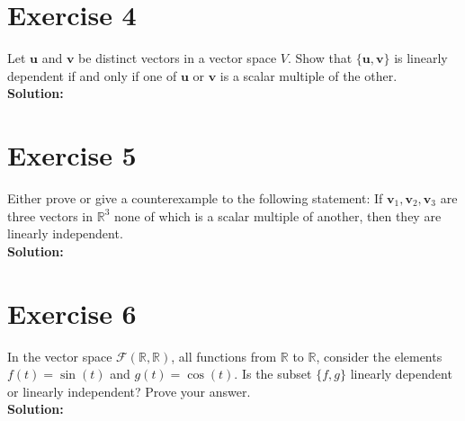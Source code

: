 \documentclass{article}
\begin{document}
\section*{Exercise 4}
Let $\mathbf{u}$ and $\mathbf{v}$ be distinct vectors in a vector space $V$. Show that $\{\mathbf{u}, \mathbf{v}\}$ is linearly dependent if and only if one of $\mathbf{u}$ or $\mathbf{v}$ is a scalar multiple of the other. \\

\textbf{Solution:}
\newpage

\section*{Exercise 5}
Either prove or give a counterexample to the following statement: If $\mathbf{v}_1, \mathbf{v}_2, \mathbf{v}_3$ are three vectors in $\mathbb{R}^3$ none of which is a scalar multiple of another, then they are linearly independent. \\

\textbf{Solution:}
\newpage

\section*{Exercise 6}
In the vector space $\mathcal{F}(\mathbb{R},\mathbb{R})$, all functions from $\mathbb{R}$ to $\mathbb{R}$, consider the elements $f(t) = \sin(t)$ and $g(t) = \cos(t)$. Is the subset $\{f,g\}$ linearly dependent or linearly independent? Prove your answer. \\

\textbf{Solution:}
\end{document}
